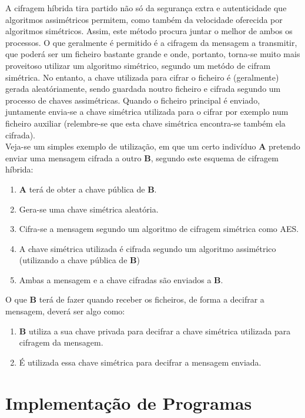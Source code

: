 \documentclass[a4paper,11pt,openright,oneside]{report}
\begin{document}
A cifragem híbrida tira partido não só da segurança extra e autenticidade que algoritmos assimétricos permitem, como também da velocidade oferecida por algoritmos simétricos. Assim, este método procura juntar o melhor de ambos os processos. O que geralmente é permitido é a cifragem da mensagem a transmitir, que poderá ser um ficheiro bastante grande e onde, portanto, torna-se muito mais proveitoso utilizar um algoritmo simétrico, segundo um metódo de cifram simétrica. No entanto, a chave utilizada para cifrar o ficheiro é (geralmente) gerada aleatóriamente, sendo guardada noutro ficheiro e cifrada segundo um processo de chaves assimétricas. Quando o ficheiro principal é enviado, juntamente envia-se a chave simétrica utilizada para o cifrar por exemplo num ficheiro auxiliar (relembre-se que esta chave simétrica encontra-se também ela cifrada).\\

Veja-se um simples exemplo de utilização, em que um certo indivíduo \textbf{A} pretendo enviar uma mensagem cifrada a outro \textbf{B}, segundo este esquema de cifragem híbrida:

\begin{enumerate}
\item \textbf{A} terá de obter a chave pública de \textbf{B}.
\item Gera-se uma chave simétrica aleatória.
\item Cifra-se a mensagem segundo um algoritmo de cifragem simétrica como AES.
\item A chave simétrica utilizada é cifrada segundo um algoritmo assimétrico (utilizando a chave pública de \textbf{B})
\item Ambas a mensagem e a chave cifradas são enviados a \textbf{B}.
\end{enumerate}

O que \textbf{B} terá de fazer quando receber os ficheiros, de forma a decifrar a mensagem, deverá ser algo como:

\begin{enumerate}
\item \textbf{B} utiliza a sua chave privada para decifrar a chave simétrica utilizada para cifragem da mensagem.
\item É utilizada essa chave simétrica para decifrar a mensagem enviada.
\end{enumerate}

\chapter{Implementação de Programas}
\label{chap.programas}
\end{document}
